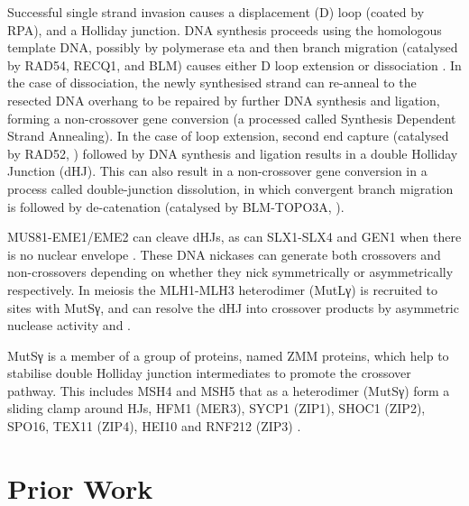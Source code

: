 Successful single strand invasion causes a displacement (D) loop (coated by RPA), and a Holliday junction. DNA synthesis proceeds using the homologous template DNA, possibly by polymerase eta \parencite{McIlwraith2005Human, Kawamoto2005Dual} and then branch migration (catalysed by RAD54, RECQ1, and BLM) causes either D loop extension or dissociation \parencite{Bugreev2006Rad54,Bugreev2008RECQ1, Mazina2012Polarity}. In the case of dissociation, the newly synthesised strand can re-anneal to the resected DNA overhang to be repaired by further DNA synthesis and ligation, forming a non-crossover gene conversion (a processed called Synthesis Dependent Strand Annealing). In the case of loop extension, second end capture (catalysed by RAD52, \cite{Sugiyama1998DNA, Sugiyama2006Rad52mediated, McIlwraith2008DNA, Lao2008Rad52}) followed by DNA synthesis and ligation results in a double Holliday Junction (dHJ). This can also result in a non-crossover gene conversion in a process called double-junction dissolution, in which convergent branch migration is followed by de-catenation (catalysed by BLM-TOPO3A, \cite{Wu2003Bloom, Bizard2014Dissolution}).

MUS81-EME1/EME2 can cleave dHJs, as can SLX1-SLX4 and GEN1 when there is no nuclear envelope \parencite[reviewed in][]{Wyatt2014Holliday}. These DNA nickases can generate both crossovers and non-crossovers depending on whether they nick symmetrically or asymmetrically respectively. In meiosis the MLH1-MLH3 heterodimer (MutLγ) is recruited to sites with MutSγ, and can resolve the dHJ into crossover products by asymmetric nuclease activity \parencite{Zakharyevich2012Delineation} and \parencite[reviewed in][]{Hunter2015Meiotic, Gray2016Control, Manhart2016Roles, Toledo2019mutation}. 

MutSγ is a member of a group of proteins, named ZMM proteins, which help to stabilise double Holliday junction intermediates to promote the crossover pathway. This includes MSH4 and MSH5 that as a heterodimer (MutSγ) form a sliding clamp around HJs, HFM1 (MER3), SYCP1 (ZIP1), SHOC1 (ZIP2), SPO16, TEX11 (ZIP4), HEI10 and RNF212 (ZIP3) \parencite[reviewed in][]{Pyatnitskaya2019Crossing}.










\section{Prior Work}

